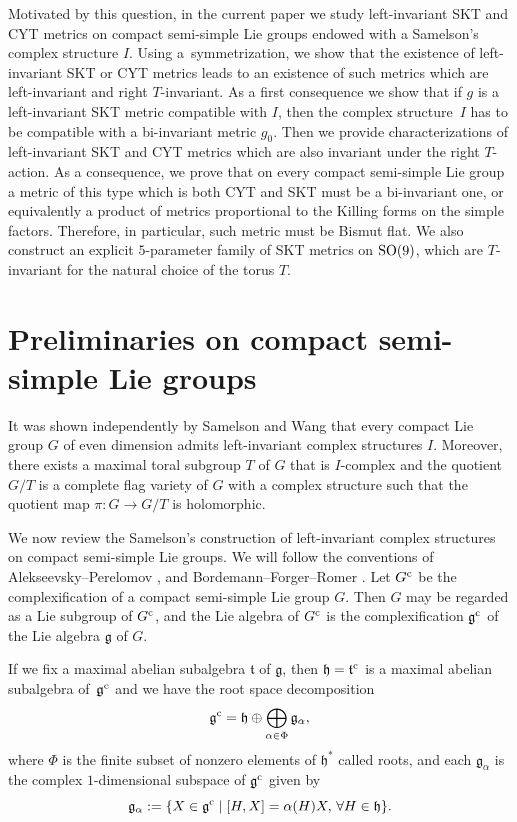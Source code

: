 \documentclass[10pt,a4paper]{amsart}
\numberwithin{equation}{section}
\begin{document}
Motivated by this question, in the current paper we study left-invariant SKT and CYT metrics on compact semi-simple Lie groups endowed with a Samelson's complex structure $I$. Using a~symmetrization, we show that the existence of left-invariant SKT or CYT metrics leads to an existence of such metrics which are left-invariant and right $T$-invariant. As a first consequence we show that if $g$ is a left-invariant SKT metric compatible with $I$, then the complex structure~$I$ has to be compatible with a bi-invariant metric $g_0$. Then we provide characterizations of left-invariant SKT and CYT metrics which are also invariant under the right $T$-action. As a consequence, we prove that on every compact semi-simple Lie group a metric of this type which is both CYT and SKT must be a bi-invariant one, or equivalently a product of metrics proportional to the Killing forms on the simple factors. Therefore, in particular, such metric must be Bismut flat. We also construct an explicit $5$-parameter family of SKT metrics on ${\rm SO}(9)$, which are $T$-invariant for the natural choice of the torus $T$.

\section{Preliminaries on compact semi-simple Lie groups}
It was shown independently by Samelson \cite{Samelson} and Wang \cite{Wang} that every compact Lie group $G$ of even dimension admits left-invariant complex structures $I$.
Moreover, there exists a maximal toral subgroup $T$ of $G$ that is $I$-complex and the quotient $G/T$
is a complete flag variety of $G$ with a complex structure such that the quotient map $\pi\colon G \rightarrow G/T$ is holomorphic.

We now review the Samelson's construction of left-invariant complex structures on compact semi-simple Lie groups.
We will follow the conventions of Alekseevsky--Perelomov \cite{AlP}, and Bordemann--Forger--Romer \cite{BFR}.
 Let $G^{\rm c}$ be the complexification of a compact semi-simple Lie group $G$. Then $G$ may be regarded as a Lie subgroup of $G^{\rm c}$, and the Lie algebra of $G^{\rm c}$ is the complexification $\mathfrak g^{\rm c}$ of the Lie algebra $\mathfrak g$ of $G$.

If we fix a maximal abelian subalgebra $\mathfrak t$ of $\mathfrak g$, then $\mathfrak h= \mathfrak t^{\rm c}$ is a maximal abelian subalgebra of~$\mathfrak g^{\rm c}$ and we have the root space decomposition
\[
\mathfrak g^{\rm c} = \mathfrak{h} \oplus \bigoplus_{\alpha \in \Phi} \mathfrak g_{\alpha},
\]
where $\Phi$ is the finite subset of nonzero elements of ${\mathfrak h}^*$ called roots, and each $\mathfrak g_{\alpha}$ is the complex $1$-dimensional subspace of $\mathfrak g^{\rm c} $ given by
\[
\mathfrak g_{\alpha} := \{ X \in {\mathfrak g}^{\rm c} \mid [H , X] = \alpha (H) X, \, \forall H \in \mathfrak{h} \}.
\]
\end{document}
